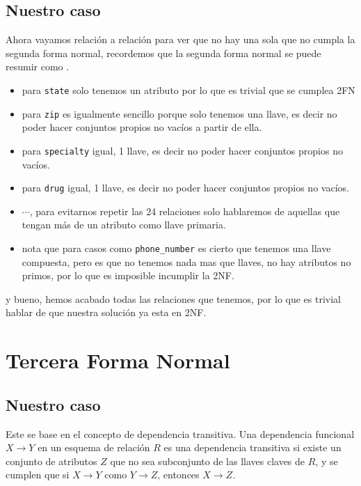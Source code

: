 \documentclass[12pt, fleqn]{report}                             %
\newcommand \Quote              {\qq}                           %
\theoremstyle{break}                                            %
\newcommand \lLongTo {\longrightarrow}                          %
\begin{document}
        \subsection{Nuestro caso}

            Ahora vayamos relación a relación para ver que no hay una sola que no cumpla la segunda forma normal, recordemos que la segunda
            forma normal se puede resumir como \Quote{the hole key}.

            \begin{itemize}
                \item para \texttt{state} solo tenemos un atributo por lo que es trivial que se cumplea 2FN
                \item para \texttt{zip} es igualmente sencillo porque solo tenemos una llave, es decir no poder hacer conjuntos propios no
                vacíos a partir de ella.
                \item para \texttt{specialty} igual, 1 llave, es decir no poder hacer conjuntos propios no vacíos.
                \item para \texttt{drug} igual, 1 llave, es decir no poder hacer conjuntos propios no vacíos.
                \item $\cdots$, para evitarnos repetir las 24 relaciones solo hablaremos de aquellas que tengan más de un atributo como
                llave primaria.
                \item nota que para casos como \texttt{phone\_number} es cierto que tenemos una llave compuesta, pero es que no tenemos
                nada mas que llaves, no hay atributos no primos, por lo que es imposible incumplir la 2NF.
            \end{itemize}

            y bueno, hemos acabado todas las relaciones que tenemos, por lo que es trivial hablar de que nuestra solución ya esta
            en 2NF.


      \section{Tercera Forma Normal}
     
        \subsection{Nuestro caso}
            Este se base en el concepto de dependencia transitiva.
            Una dependencia funcional $X \lLongTo Y$ en un esquema de relación $R$
            es una dependencia transitiva si existe un conjunto de atributos $Z$
            que no sea subconjunto de las llaves claves de $R$, y se cumplen
            que si $X \lLongTo Y$ como $Y \lLongTo Z$, entonces $X \lLongTo Z$.
\end{document}
